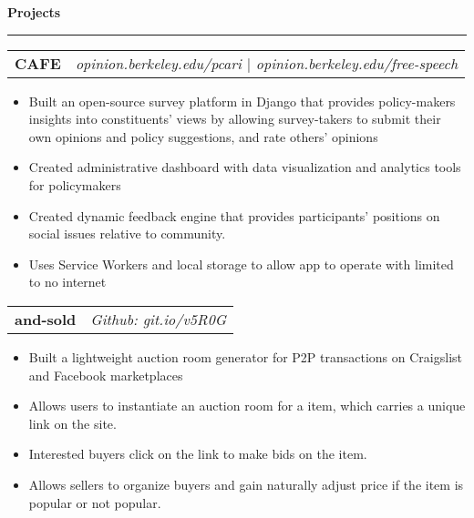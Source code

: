 \documentclass[11pt,letterpaper]{article}
\makeatletter
\newenvironment{topic}[1]
    {
    {\Large \centerline{#1}}
    \vspace*{0.03in}
    \hrule 
    \vspace*{0.05in}
    }
    {}
\newenvironment{event}
    {
    \begin{tabular*}{\textwidth}{l@{\extracolsep{\fill}}r}
    }
    {
    \end{tabular*}
    }
\makeatother
\begin{document}
    \begin{topic}{\textbf{Projects}}
        \begin{event}
            \textbf{CAFE} & \emph{opinion.berkeley.edu/pcari $\vert$ opinion.berkeley.edu/free-speech}
        \end{event}
            \begin{itemize}
                \item Built an open-source survey platform in Django that provides policy-makers insights into constituents' views by allowing survey-takers to submit their own opinions and policy suggestions, and rate others' opinions
                \item Created administrative dashboard with data visualization and analytics tools for policymakers
                \item Created dynamic feedback engine that provides participants' positions on social issues relative to community.
                \item Uses Service Workers and local storage to allow app to operate with limited to no internet
            \end{itemize}

        \begin{event}
        \textbf{and-sold} & \emph{Github: git.io/v5R0G}
        \end{event}
            \begin{itemize}
                \item Built a lightweight auction room generator for P2P transactions on Craigslist and Facebook marketplaces
                \item Allows users to instantiate an auction room for a item, which carries a unique link on the site. 
                \item Interested buyers click on the link to make bids on the item. 
                \item Allows sellers to organize buyers and gain naturally adjust price if the item is popular or not popular.
            \end{itemize}


\end{topic}
\end{document}
